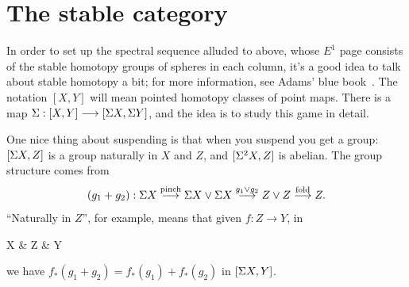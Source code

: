 \begin{center}
\end{center}

\section{The stable category} %
\label{TheStableCategory}
\ifx\OutputTheStableCategory\undefined\else
In order to set up the spectral sequence alluded to above, whose $E^1$ page consists of the stable homotopy groups of spheres in each column, it's a good idea to talk about stable homotopy a bit; for more information, see Adams' blue book~\cite{Adams}.  The notation $[X, Y]$ will mean pointed homotopy classes of point maps.  There is a map $\Sigma: [X, Y] \longrightarrow [\Sigma X, \Sigma Y]$, and the idea is to study this game in detail.

One nice thing about suspending is that when you suspend you get a group: $[\Sigma X, Z]$ is a group naturally in $X$ and $Z$, and $[\Sigma^2 X, Z]$ is abelian.  The group structure comes from
\[
(g_1 + g_2): \Sigma X \stackrel{\textup{pinch}}{\longrightarrow} \Sigma X \vee \Sigma X \stackrel{g_1 \vee g_2}{\longrightarrow} Z \vee Z \stackrel{\textup{fold}}{\longrightarrow} Z
.\]
``Naturally in $Z$'', for example, means that given $f: Z \to Y$, in
\begin{ctikzcd}
\Suspend X \rar["g_1",yshift=0.3em] \rar["g_2"',yshift=-0.3em] & Z  & Y
\end{ctikzcd}
we have $f_*(g_1 + g_2) = f_* (g_1) + f_* (g_2)$ in $[\Sigma X, Y]$.

